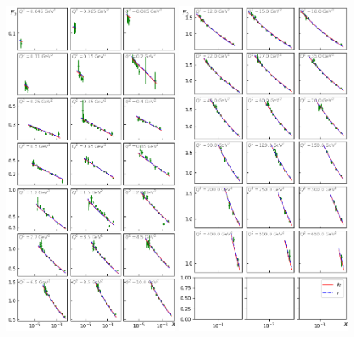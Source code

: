 \documentclass[11pt]{article}
\numberwithin{equation}{section}
\numberwithin{table}{section}
\numberwithin{figure}{section}
\begin{document}
\begin{figure}[p]
\includegraphics[width=0.49\textwidth,height=1.0\textwidth]{./plots/Figure_2-1.png}
\includegraphics[width=0.49\textwidth,height=1.0\textwidth]{./plots/Figure_2-2.png}\\

\end{figure}
\end{document}
